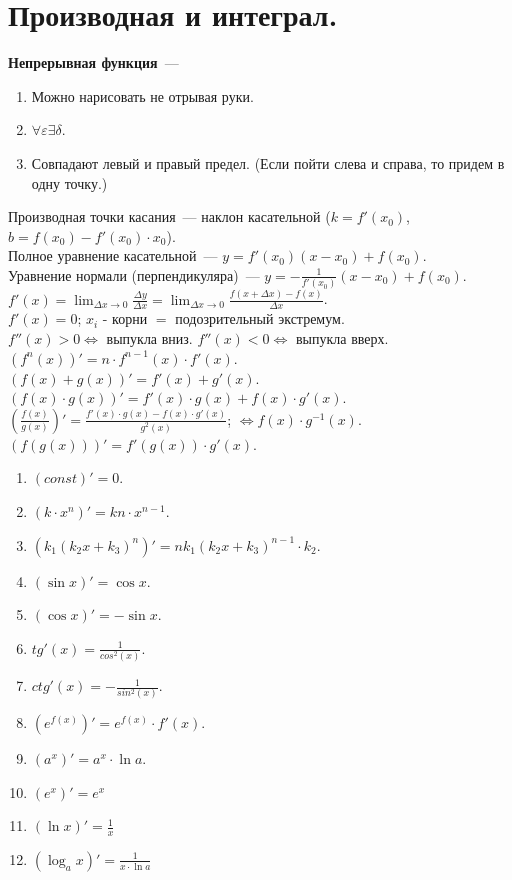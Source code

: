 \documentclass{article}
\begin{document}
	\section{Производная и интеграл.}
	\textbf{Непрерывная функция}~--- \\
	\begin{enumerate}
		\item Можно нарисовать не отрывая руки.
		\item $\forall \varepsilon \exists \delta$.
		\item Совпадают левый и правый предел. (Если пойти слева и справа, то придем в одну точку.)
	\end{enumerate}
	Производная точки касания~--- наклон касательной ($k = f'(x_0)$, $b = f(x_0) - f'(x_0) \cdot x_0$). \\
	Полное уравнение касательной~--- $y = f'(x_0)(x - x_0) + f(x_0)$. \\
	Уравнение нормали (перпендикуляра)~--- $y = -\frac{1}{f'(x_0)}(x - x_0) + f(x_0)$. \\
	$f'(x) = \lim_{\varDelta x \rightarrow 0} \frac{\varDelta y}{\varDelta x} = \lim_{\varDelta x \rightarrow 0} \frac{f(x + \varDelta x) - f(x)}{\varDelta x}$. \\
	$f'(x) = 0$; $x_i$ - корни $=$ подозрительный экстремум. \\
	$f''(x) > 0 \Leftrightarrow$ выпукла вниз. $f''(x) < 0 \Leftrightarrow$ выпукла вверх. \\
	$(f^n(x))' = n \cdot f^{n - 1}(x) \cdot f'(x)$. \\
	$(f(x) + g(x))' = f'(x) + g'(x)$. \\
	$(f(x) \cdot g(x))' = f'(x) \cdot g(x) + f(x) \cdot g'(x)$. \\
	$(\frac{f(x)}{g(x)})' = \frac{f'(x) \cdot g(x) - f(x) \cdot g'(x)}{g^2(x)}$; $\Leftrightarrow f(x) \cdot g^{-1}(x)$. \\
	$(f(g(x)))' = f'(g(x)) \cdot g'(x)$. \\
	\begin{enumerate}
		\item $(const)' = 0$.
		\item $(k \cdot x^n)' = kn \cdot x^{n - 1}$.
		\item $(k_1(k_2x + k_3)^n)' = nk_1(k_2x + k_3)^{n - 1} \cdot k_2$.
		\item $(\sin x)' = \cos x$.
		\item $(\cos x)' = - \sin x$.
		\item $tg'(x) = \frac{1}{cos^2(x)}$.
		\item $ctg'(x) = - \frac{1}{sin^2(x)}$.
		\item $(e^{f(x)})' = e^{f(x)} \cdot f'(x)$.
		\item $(a^x)' = a^x \cdot \ln a$.
		\item $(e^x)' = e^x$
		\item $(\ln x)' = \frac{1}{x}$
		\item $(\log_a x)' = \frac{1}{x \cdot \ln a}$
	\end{enumerate}
\end{document}
